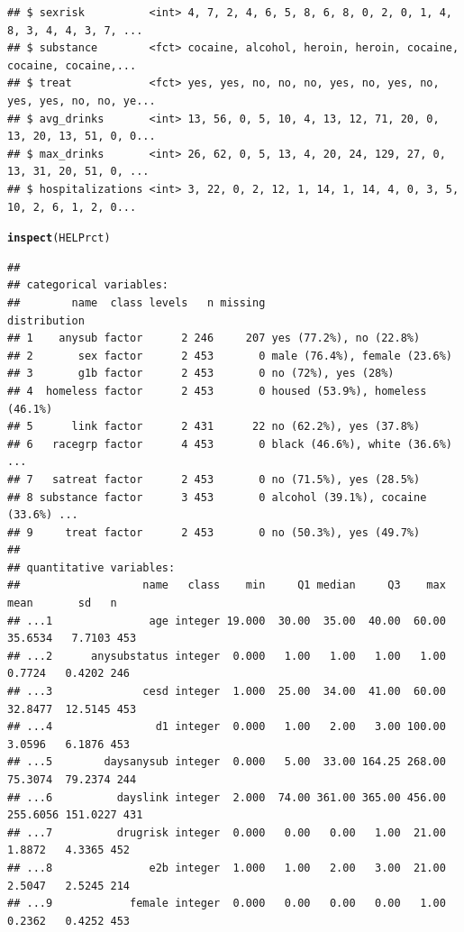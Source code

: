 \documentclass[twoside]{book}\usepackage[]{graphicx}\usepackage[]{xcolor}
\makeatletter
\newcommand{\hlstd}[1]{\textcolor[rgb]{0.345,0.345,0.345}{#1}}%
\newcommand{\hlkwd}[1]{\textcolor[rgb]{0.737,0.353,0.396}{\textbf{#1}}}%
\newenvironment{kframe}{%
 \def\at@end@of@kframe{}%
 \ifinner\ifhmode%
  \def\at@end@of@kframe{\end{minipage}}%
  \begin{minipage}{\columnwidth}%
 \fi\fi%
 \def\FrameCommand##1{\hskip\@totalleftmargin \hskip-\fboxsep
 \colorbox{shadecolor}{##1}\hskip-\fboxsep
     \hskip-\linewidth \hskip-\@totalleftmargin \hskip\columnwidth}%
 \MakeFramed {\advance\hsize-\width
   \@totalleftmargin\z@ \linewidth\hsize
   \@setminipage}}%
 {\par\unskip\endMakeFramed%
 \at@end@of@kframe}
\newenvironment{knitrout}{}{} %
\makeatother
\begin{document}
\begin{knitrout}
\begin{kframe}
\begin{verbatim}
## $ sexrisk          <int> 4, 7, 2, 4, 6, 5, 8, 6, 8, 0, 2, 0, 1, 4, 8, 3, 4, 4, 3, 7, ...
## $ substance        <fct> cocaine, alcohol, heroin, heroin, cocaine, cocaine, cocaine,...
## $ treat            <fct> yes, yes, no, no, no, yes, no, yes, no, yes, yes, no, no, ye...
## $ avg_drinks       <int> 13, 56, 0, 5, 10, 4, 13, 12, 71, 20, 0, 13, 20, 13, 51, 0, 0...
## $ max_drinks       <int> 26, 62, 0, 5, 13, 4, 20, 24, 129, 27, 0, 13, 31, 20, 51, 0, ...
## $ hospitalizations <int> 3, 22, 0, 2, 12, 1, 14, 1, 14, 4, 0, 3, 5, 10, 2, 6, 1, 2, 0...
\end{verbatim}
\begin{alltt}
\hlkwd{inspect}\hlstd{(HELPrct)}
\end{alltt}
\begin{verbatim}
## 
## categorical variables:  
##        name  class levels   n missing                                  distribution
## 1    anysub factor      2 246     207 yes (77.2%), no (22.8%)                      
## 2       sex factor      2 453       0 male (76.4%), female (23.6%)                 
## 3       g1b factor      2 453       0 no (72%), yes (28%)                          
## 4  homeless factor      2 453       0 housed (53.9%), homeless (46.1%)             
## 5      link factor      2 431      22 no (62.2%), yes (37.8%)                      
## 6   racegrp factor      4 453       0 black (46.6%), white (36.6%) ...             
## 7   satreat factor      2 453       0 no (71.5%), yes (28.5%)                      
## 8 substance factor      3 453       0 alcohol (39.1%), cocaine (33.6%) ...         
## 9     treat factor      2 453       0 no (50.3%), yes (49.7%)                      
## 
## quantitative variables:  
##                   name   class    min     Q1 median     Q3    max     mean       sd   n
## ...1               age integer 19.000  30.00  35.00  40.00  60.00  35.6534   7.7103 453
## ...2      anysubstatus integer  0.000   1.00   1.00   1.00   1.00   0.7724   0.4202 246
## ...3              cesd integer  1.000  25.00  34.00  41.00  60.00  32.8477  12.5145 453
## ...4                d1 integer  0.000   1.00   2.00   3.00 100.00   3.0596   6.1876 453
## ...5        daysanysub integer  0.000   5.00  33.00 164.25 268.00  75.3074  79.2374 244
## ...6          dayslink integer  2.000  74.00 361.00 365.00 456.00 255.6056 151.0227 431
## ...7          drugrisk integer  0.000   0.00   0.00   1.00  21.00   1.8872   4.3365 452
## ...8               e2b integer  1.000   1.00   2.00   3.00  21.00   2.5047   2.5245 214
## ...9            female integer  0.000   0.00   0.00   0.00   1.00   0.2362   0.4252 453

\end{verbatim}
\end{kframe}
\end{knitrout}
\end{document}
